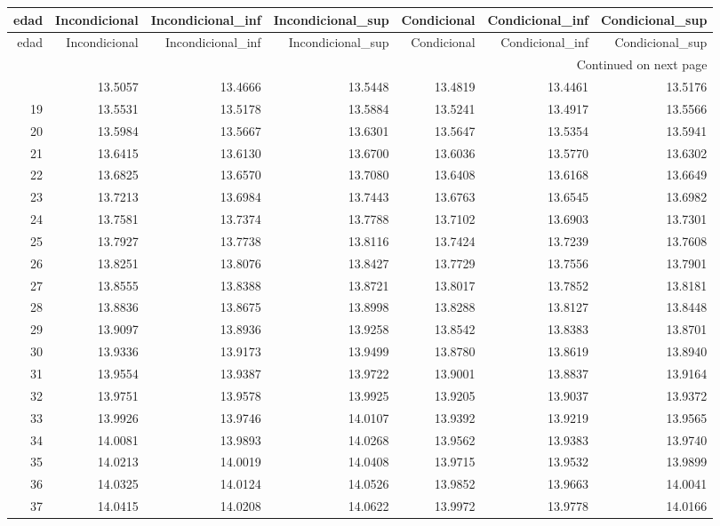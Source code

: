\begin{longtable}{rrrrrrr}
\toprule
edad & Incondicional & Incondicional\_inf & Incondicional\_sup & Condicional & Condicional\_inf & Condicional\_sup \\
\midrule
\endfirsthead
\toprule
edad & Incondicional & Incondicional\_inf & Incondicional\_sup & Condicional & Condicional\_inf & Condicional\_sup \\
\midrule
\endhead
\midrule
\multicolumn{7}{r}{Continued on next page} \\
\midrule
\endfoot
\bottomrule
\endlastfoot
18 & 13.5057 & 13.4666 & 13.5448 & 13.4819 & 13.4461 & 13.5176 \\
19 & 13.5531 & 13.5178 & 13.5884 & 13.5241 & 13.4917 & 13.5566 \\
20 & 13.5984 & 13.5667 & 13.6301 & 13.5647 & 13.5354 & 13.5941 \\
21 & 13.6415 & 13.6130 & 13.6700 & 13.6036 & 13.5770 & 13.6302 \\
22 & 13.6825 & 13.6570 & 13.7080 & 13.6408 & 13.6168 & 13.6649 \\
23 & 13.7213 & 13.6984 & 13.7443 & 13.6763 & 13.6545 & 13.6982 \\
24 & 13.7581 & 13.7374 & 13.7788 & 13.7102 & 13.6903 & 13.7301 \\
25 & 13.7927 & 13.7738 & 13.8116 & 13.7424 & 13.7239 & 13.7608 \\
26 & 13.8251 & 13.8076 & 13.8427 & 13.7729 & 13.7556 & 13.7901 \\
27 & 13.8555 & 13.8388 & 13.8721 & 13.8017 & 13.7852 & 13.8181 \\
28 & 13.8836 & 13.8675 & 13.8998 & 13.8288 & 13.8127 & 13.8448 \\
29 & 13.9097 & 13.8936 & 13.9258 & 13.8542 & 13.8383 & 13.8701 \\
30 & 13.9336 & 13.9173 & 13.9499 & 13.8780 & 13.8619 & 13.8940 \\
31 & 13.9554 & 13.9387 & 13.9722 & 13.9001 & 13.8837 & 13.9164 \\
32 & 13.9751 & 13.9578 & 13.9925 & 13.9205 & 13.9037 & 13.9372 \\
33 & 13.9926 & 13.9746 & 14.0107 & 13.9392 & 13.9219 & 13.9565 \\
34 & 14.0081 & 13.9893 & 14.0268 & 13.9562 & 13.9383 & 13.9740 \\
35 & 14.0213 & 14.0019 & 14.0408 & 13.9715 & 13.9532 & 13.9899 \\
36 & 14.0325 & 14.0124 & 14.0526 & 13.9852 & 13.9663 & 14.0041 \\
37 & 14.0415 & 14.0208 & 14.0622 & 13.9972 & 13.9778 & 14.0166 \\

\end{longtable}
